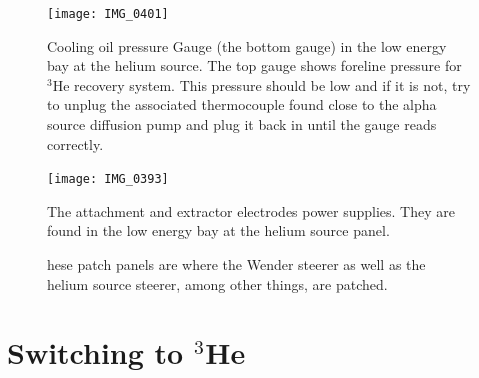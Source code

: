 \documentclass{article}
\begin{document}
\begin{figure}
\begin{center}
\texttt{[image: IMG\_0401]}\\
\end{center}
\caption{\label{figure15}Cooling oil pressure Gauge (the bottom gauge) in the low energy bay at the helium source. The top gauge shows foreline pressure for $^{3}$He recovery system. This pressure should be low and if it is not, try to unplug the associated thermocouple found close to the alpha source diffusion pump and plug it back in until the gauge reads correctly.}
\end{figure}

\begin{figure}
\begin{center}
\texttt{[image: IMG\_0393]}\\
\end{center}
\caption{\label{figure16}The attachment and extractor electrodes power supplies. They are found in the low energy bay at the helium source panel.}
\end{figure}

\begin{figure}
\begin{center}
  \quad
\end{center}
  \caption{\label{figure17}hese patch panels are where the Wender steerer as well as the helium source steerer, among other things, are patched.}
\end{figure}

\section{Switching to $^{3}$He}
\label{he-3_beam}
\end{document}
